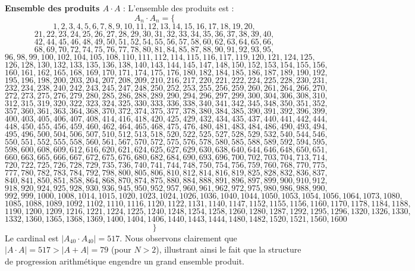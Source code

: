 \documentclass[11pt,a4paper]{article}
\begin{document}
\textbf{Ensemble des produits $A \cdot A$} :
L'ensemble des produits est :
$$ A_{{{n}}} \cdot A_{{{n}}} = \{ $$$$ 1, 2, 3, 4, 5, 6, 7, 8, 9, 10, 11, 12, 13, 14, 15, 16, 17, 18, 19, 20, $$$$ 21, 22, 23, 24, 25, 26, 27, 28, 29, 30, 31, 32, 33, 34, 35, 36, 37, 38, 39, 40, $$$$ 42, 44, 45, 46, 48, 49, 50, 51, 52, 54, 55, 56, 57, 58, 60, 62, 63, 64, 65, 66, $$$$ 68, 69, 70, 72, 74, 75, 76, 77, 78, 80, 81, 84, 85, 87, 88, 90, 91, 92, 93, 95, $$$$ 96, 98, 99, 100, 102, 104, 105, 108, 110, 111, 112, 114, 115, 116, 117, 119, 120, 121, 124, 125, $$$$ 126, 128, 130, 132, 133, 135, 136, 138, 140, 143, 144, 145, 147, 148, 150, 152, 153, 154, 155, 156, $$$$ 160, 161, 162, 165, 168, 169, 170, 171, 174, 175, 176, 180, 182, 184, 185, 186, 187, 189, 190, 192, $$$$ 195, 196, 198, 200, 203, 204, 207, 208, 209, 210, 216, 217, 220, 221, 222, 224, 225, 228, 230, 231, $$$$ 232, 234, 238, 240, 242, 243, 245, 247, 248, 250, 252, 253, 255, 256, 259, 260, 261, 264, 266, 270, $$$$ 272, 273, 275, 276, 279, 280, 285, 286, 288, 289, 290, 294, 296, 297, 299, 300, 304, 306, 308, 310, $$$$ 312, 315, 319, 320, 322, 323, 324, 325, 330, 333, 336, 338, 340, 341, 342, 345, 348, 350, 351, 352, $$$$ 357, 360, 361, 363, 364, 368, 370, 372, 374, 375, 377, 378, 380, 384, 385, 390, 391, 392, 396, 399, $$$$ 400, 403, 405, 406, 407, 408, 414, 416, 418, 420, 425, 429, 432, 434, 435, 437, 440, 441, 442, 444, $$$$ 448, 450, 455, 456, 459, 460, 462, 464, 465, 468, 475, 476, 480, 481, 483, 484, 486, 490, 493, 494, $$$$ 495, 496, 500, 504, 506, 507, 510, 512, 513, 518, 520, 522, 525, 527, 528, 529, 532, 540, 544, 546, $$$$ 550, 551, 552, 555, 558, 560, 561, 567, 570, 572, 575, 576, 578, 580, 585, 588, 589, 592, 594, 595, $$$$ 598, 600, 608, 609, 612, 616, 620, 621, 624, 625, 627, 629, 630, 638, 640, 644, 646, 648, 650, 651, $$$$ 660, 663, 665, 666, 667, 672, 675, 676, 680, 682, 684, 690, 693, 696, 700, 702, 703, 704, 713, 714, $$$$ 720, 722, 725, 726, 728, 729, 735, 736, 740, 741, 744, 748, 750, 754, 756, 759, 760, 768, 770, 775, $$$$ 777, 780, 782, 783, 784, 792, 798, 800, 805, 806, 810, 812, 814, 816, 819, 825, 828, 832, 836, 837, $$$$ 840, 841, 850, 851, 858, 864, 868, 870, 874, 875, 880, 884, 888, 891, 896, 897, 899, 900, 910, 912, $$$$ 918, 920, 924, 925, 928, 930, 936, 945, 950, 952, 957, 960, 961, 962, 972, 975, 980, 986, 988, 990, $$$$ 992, 999, 1000, 1008, 1014, 1015, 1020, 1023, 1024, 1026, 1036, 1040, 1044, 1050, 1053, 1054, 1056, 1064, 1073, 1080, $$$$ 1085, 1088, 1089, 1092, 1102, 1110, 1116, 1120, 1122, 1131, 1140, 1147, 1152, 1155, 1156, 1160, 1170, 1178, 1184, 1188, $$$$ 1190, 1200, 1209, 1216, 1221, 1224, 1225, 1240, 1248, 1254, 1258, 1260, 1280, 1287, 1292, 1295, 1296, 1320, 1326, 1330, $$$$ 1332, 1360, 1365, 1368, 1369, 1400, 1404, 1406, 1440, 1443, 1444, 1480, 1482, 1520, 1521, 1560, 1600 $$$$ \} $$
Le cardinal est $|A_{40} \cdot A_{40}| = 517$.
Nous observons clairement que $|A \cdot A| = 517 > |A+A| = 79$ (pour $N > 2$), illustrant ainsi le fait que la structure de progression arithmétique engendre un grand ensemble produit.
\newpage
\end{document}
